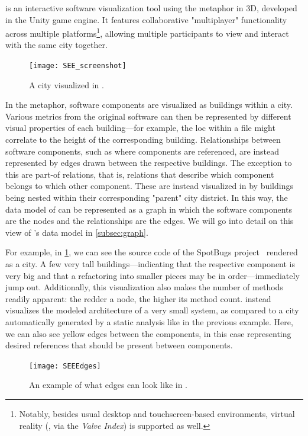\documentclass[../thesis]{subfiles}
\begin{document}
\SEE{} is an interactive software visualization tool using the  metaphor in 3D, developed in the {Unity} game engine.
It features collaborative "multiplayer" functionality across multiple platforms\footnote{
	Notably, besides usual desktop and touchscreen-based environments, virtual reality (\eg, via the \emph{Valve Index}) is supported as well.
}, allowing multiple participants to view and interact with the same \gls*{city} together.

\begin{figure}
	\centering
	\texttt{[image: SEE\_screenshot]}
	\caption{A \gls{city} visualized in \SEE{}.}\label{fig:city}
\end{figure}

In the  metaphor, software components are visualized as buildings within a city.
Various metrics from the original software can then be represented by different visual properties of each building---for example, the \gls{loc} within a file might correlate to the height of the corresponding building.
Relationships between software components, such as where components are referenced, are instead represented by edges drawn between the respective buildings.
The exception to this are part-of relations, that is, relations that describe which component belongs to which other component.
These are instead visualized in \SEE{} by buildings being nested within their corresponding "parent" city district.
In this way, the data model of \SEE{} can be represented as a graph in which the software components are the nodes and the relationships are the edges.
We will go into detail on this view of \SEE{}'s data model in \cref{subsec:graph}.

For example, in \cref{fig:city}, we can see the source code of the SpotBugs project~\cite{spotbugs} rendered as a \gls{city}.
A few very tall buildings---indicating that the respective component is very big and that a refactoring into smaller pieces may be in order---immediately jump out.
Additionally, this visualization also makes the number of methods readily apparent:
the redder a node, the higher its method count.
 instead visualizes the modeled architecture of a very small system, as compared to a city automatically generated by a static analysis like in the previous example.
Here, we can also see yellow edges between the components, in this case representing desired references that should be present between components.

\begin{figure}
	\begin{center}
		\texttt{[image: SEEEdges]}
	\end{center}
	\caption{An example of what edges can look like in \SEE{}.}\label{fig:edges}
\end{figure}
\end{document}
